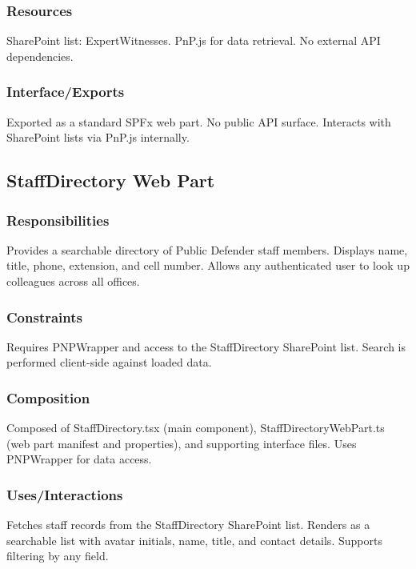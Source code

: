 \documentclass[12pt]{article}
\begin{document}
\subsubsection{Resources}

SharePoint list: ExpertWitnesses. PnP.js for data retrieval. No external API dependencies.

\subsubsection{Interface/Exports}

Exported as a standard SPFx web part. No public API surface. Interacts with SharePoint lists via PnP.js internally.

\subsection{StaffDirectory Web Part}

\subsubsection{Responsibilities}

Provides a searchable directory of Public Defender staff members. Displays name, title, phone, extension, and cell number. Allows any authenticated user to look up colleagues across all offices.

\subsubsection{Constraints}

Requires PNPWrapper and access to the StaffDirectory SharePoint list. Search is performed client-side against loaded data.

\subsubsection{Composition}

Composed of StaffDirectory.tsx (main component), StaffDirectoryWebPart.ts (web part manifest and properties), and supporting interface files. Uses PNPWrapper for data access.

\subsubsection{Uses/Interactions}

Fetches staff records from the StaffDirectory SharePoint list. Renders as a searchable list with avatar initials, name, title, and contact details. Supports filtering by any field.
\end{document}
